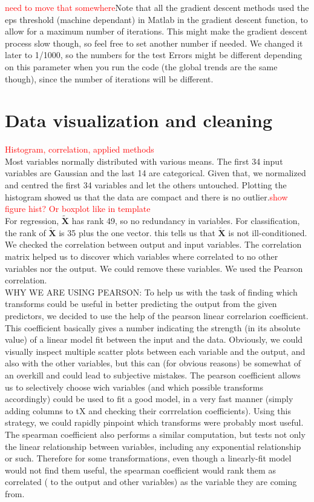\documentclass{article} %
\begin{document}
\textcolor{red}{need to move that somewhere}Note that all the gradient descent methods used the eps threshold (machine dependant) in Matlab in the gradient descent function, to allow for a maximum number of iterations. This might make the gradient descent process slow though, so feel free to set another number if needed. We changed it later to 1/1000, so the numbers for the test Errors might be different depending on this parameter when you run the code (the global trends are the same though), since the number of iterations will be different.

\section{Data visualization and cleaning}
\textcolor{red}{Histogram, correlation, applied methods}\\
Most variables normally distributed with various means. The first 34 input variables are Gaussian and the last 14 are categorical. Given that, we normalized and centred the first 34 variables and let the others untouched. Plotting the histogram showed us that the data are compact and there is no outlier.\textcolor{red}{show figure hist? Or boxplot like in template}\\
For regression, $\mathbf{\tilde{X}}$ has rank 49, so no redundancy in variables. For classification, the rank of $\mathbf{\tilde{X}}$ is 35 plus the one vector. this tells us that $\mathbf{\tilde{X}}$ is not ill-conditioned.\\
We checked the correlation between output and input variables. The correlation matrix helped us to discover which variables where correlated to no other variables nor the output. We could remove these variables. We used the Pearson correlation.\\

WHY WE ARE USING PEARSON:
To help us with the task of finding which transforms could be useful in better predicting the output from the given predictors, we decided to use the help of the pearson linear correlarion coefficient. This coefficient basically gives a number indicating the strength (in its absolute value) of a linear model fit between the input and the data. Obviously, we could visually inspect multiple scatter plots between each variable and the output, and also with the other variables, but this can (for obvious reasons) be somewhat of an overkill and could lead to subjective mistakes. The pearson coefficient allows us to selectively choose wich variables (and which possible transforms accordingly) could be used to fit a good model, in a very fast manner (simply adding columns to tX and checking their corrrelation coefficients). Using this strategy, we could rapidly pinpoint which transforms were probably most useful. The spearman coefficient also performs a similar computation, but tests not only the linear relationship between variables, including any exponential relationship or such. Therefore for some transformations, even though a linearly-fit model would not find them useful, the spearman coefficient would rank them as correlated ( to the output and other variables) as the variable they are coming from.\\
\end{document}
